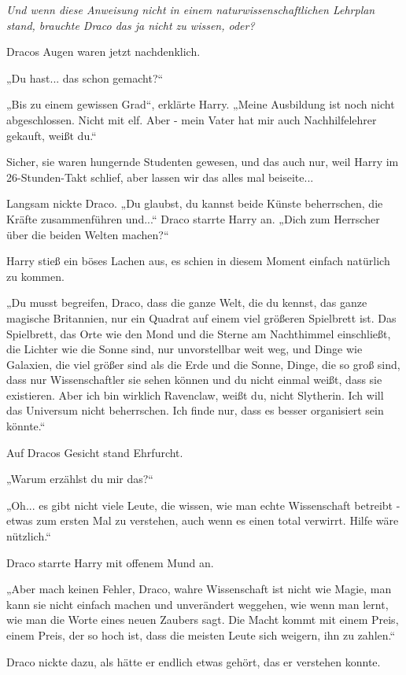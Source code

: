{\emph{Und wenn diese Anweisung nicht in einem naturwissenschaftlichen Lehrplan stand, brauchte Draco das ja nicht zu wissen, oder?}

Dracos Augen waren jetzt nachdenklich.

„Du hast... das schon gemacht?“

„Bis zu einem gewissen Grad“, erklärte Harry. „Meine Ausbildung ist noch nicht abgeschlossen. Nicht mit elf. Aber - mein Vater hat mir auch Nachhilfelehrer gekauft, weißt du.“

Sicher, sie waren hungernde Studenten gewesen, und das auch nur, weil Harry im 26-Stunden-Takt schlief, aber lassen wir das alles mal beiseite...

Langsam nickte Draco. „Du glaubst, du kannst beide Künste beherrschen, die Kräfte zusammenführen und...“ Draco starrte Harry an. „Dich zum Herrscher über die beiden Welten machen?“

Harry stieß ein böses Lachen aus, es schien in diesem Moment einfach natürlich zu kommen.

„Du musst begreifen, Draco, dass die ganze Welt, die du kennst, das ganze magische Britannien, nur ein Quadrat auf einem viel größeren Spielbrett ist. Das Spielbrett, das Orte wie den Mond und die Sterne am Nachthimmel einschließt, die Lichter wie die Sonne sind, nur unvorstellbar weit weg, und Dinge wie Galaxien, die viel größer sind als die Erde und die Sonne, Dinge, die so groß sind, dass nur Wissenschaftler sie sehen können und du nicht einmal weißt, dass sie existieren. Aber ich bin wirklich Ravenclaw, weißt du, nicht Slytherin. Ich will das Universum nicht beherrschen. Ich finde nur, dass es besser organisiert sein könnte.“

Auf Dracos Gesicht stand Ehrfurcht.

„Warum erzählst du mir das?“

„Oh... es gibt nicht viele Leute, die wissen, wie man echte Wissenschaft betreibt - etwas zum ersten Mal zu verstehen, auch wenn es einen total verwirrt. Hilfe wäre nützlich.“

Draco starrte Harry mit offenem Mund an.

„Aber mach keinen Fehler, Draco, wahre Wissenschaft ist nicht wie Magie, man kann sie nicht einfach machen und unverändert weggehen, wie wenn man lernt, wie man die Worte eines neuen Zaubers sagt. Die Macht kommt mit einem Preis, einem Preis, der so hoch ist, dass die meisten Leute sich weigern, ihn zu zahlen.“

Draco nickte dazu, als hätte er endlich etwas gehört, das er verstehen konnte.

}
